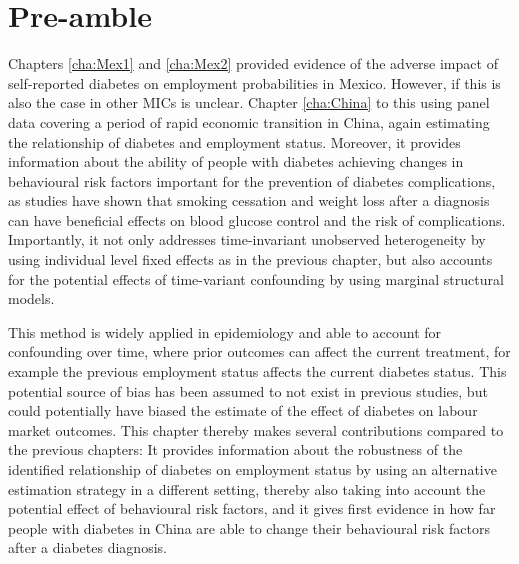 \section*{Pre-amble}

Chapters \ref{cha:Mex1} and \ref{cha:Mex2} provided evidence of the adverse impact of self-reported diabetes on employment probabilities in Mexico. However, if this is also the case in other \acp{MIC} is unclear. Chapter \ref{cha:China} \DIFdelbegin {}\DIFdelend \DIFaddbegin {}\DIFaddend to this using panel data covering a period of rapid economic transition in China, again estimating the relationship of diabetes and employment status. Moreover, it provides information about the ability of people with diabetes achieving changes in behavioural risk factors important for the prevention of diabetes complications, as studies have shown that smoking cessation and weight loss after a diagnosis can have beneficial effects on blood glucose control and the risk of complications. Importantly, it not only addresses time-invariant unobserved heterogeneity by using individual level fixed effects as in the previous chapter, but also accounts for the potential effects of time-variant confounding by using marginal structural models.

This method is widely applied in epidemiology and able to account for confounding over time, where prior outcomes can affect the current treatment, for example the previous employment status affects the current diabetes status. This potential source of bias has been assumed to not exist in previous studies, but could potentially have biased the estimate of the effect of diabetes on labour market outcomes. This chapter thereby makes several contributions compared to the previous chapters: It provides information about the robustness of the identified relationship of diabetes on employment status by using an alternative estimation strategy in a different setting, thereby also taking into account the potential effect of behavioural risk factors, and it gives first evidence in how far people with diabetes in China are able to change their behavioural risk factors after a diabetes diagnosis.


